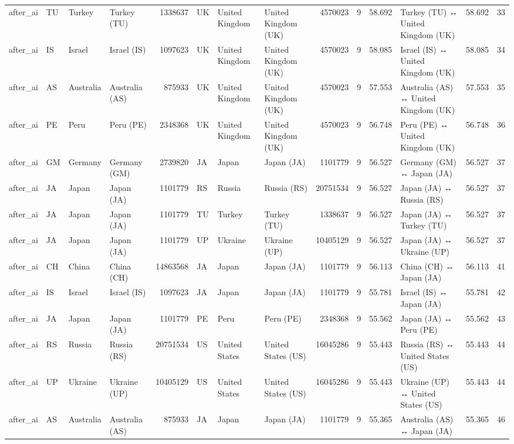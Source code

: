 \begin{tabular}{llllrlllrrrlrr}
after\_ai & TU & Turkey & Turkey (TU) & 1338637 & UK & United Kingdom & United Kingdom (UK) & 4570023 & 9 & 58.692 & Turkey (TU) ↔ United Kingdom (UK) & 58.692 & 33 \\
after\_ai & IS & Israel & Israel (IS) & 1097623 & UK & United Kingdom & United Kingdom (UK) & 4570023 & 9 & 58.085 & Israel (IS) ↔ United Kingdom (UK) & 58.085 & 34 \\
after\_ai & AS & Australia & Australia (AS) & 875933 & UK & United Kingdom & United Kingdom (UK) & 4570023 & 9 & 57.553 & Australia (AS) ↔ United Kingdom (UK) & 57.553 & 35 \\
after\_ai & PE & Peru & Peru (PE) & 2348368 & UK & United Kingdom & United Kingdom (UK) & 4570023 & 9 & 56.748 & Peru (PE) ↔ United Kingdom (UK) & 56.748 & 36 \\
after\_ai & GM & Germany & Germany (GM) & 2739820 & JA & Japan & Japan (JA) & 1101779 & 9 & 56.527 & Germany (GM) ↔ Japan (JA) & 56.527 & 37 \\
after\_ai & JA & Japan & Japan (JA) & 1101779 & RS & Russia & Russia (RS) & 20751534 & 9 & 56.527 & Japan (JA) ↔ Russia (RS) & 56.527 & 37 \\
after\_ai & JA & Japan & Japan (JA) & 1101779 & TU & Turkey & Turkey (TU) & 1338637 & 9 & 56.527 & Japan (JA) ↔ Turkey (TU) & 56.527 & 37 \\
after\_ai & JA & Japan & Japan (JA) & 1101779 & UP & Ukraine & Ukraine (UP) & 10405129 & 9 & 56.527 & Japan (JA) ↔ Ukraine (UP) & 56.527 & 37 \\
after\_ai & CH & China & China (CH) & 14863568 & JA & Japan & Japan (JA) & 1101779 & 9 & 56.113 & China (CH) ↔ Japan (JA) & 56.113 & 41 \\
after\_ai & IS & Israel & Israel (IS) & 1097623 & JA & Japan & Japan (JA) & 1101779 & 9 & 55.781 & Israel (IS) ↔ Japan (JA) & 55.781 & 42 \\
after\_ai & JA & Japan & Japan (JA) & 1101779 & PE & Peru & Peru (PE) & 2348368 & 9 & 55.562 & Japan (JA) ↔ Peru (PE) & 55.562 & 43 \\
after\_ai & RS & Russia & Russia (RS) & 20751534 & US & United States & United States (US) & 16045286 & 9 & 55.443 & Russia (RS) ↔ United States (US) & 55.443 & 44 \\
after\_ai & UP & Ukraine & Ukraine (UP) & 10405129 & US & United States & United States (US) & 16045286 & 9 & 55.443 & Ukraine (UP) ↔ United States (US) & 55.443 & 44 \\
after\_ai & AS & Australia & Australia (AS) & 875933 & JA & Japan & Japan (JA) & 1101779 & 9 & 55.365 & Australia (AS) ↔ Japan (JA) & 55.365 & 46 \\

\end{tabular}
